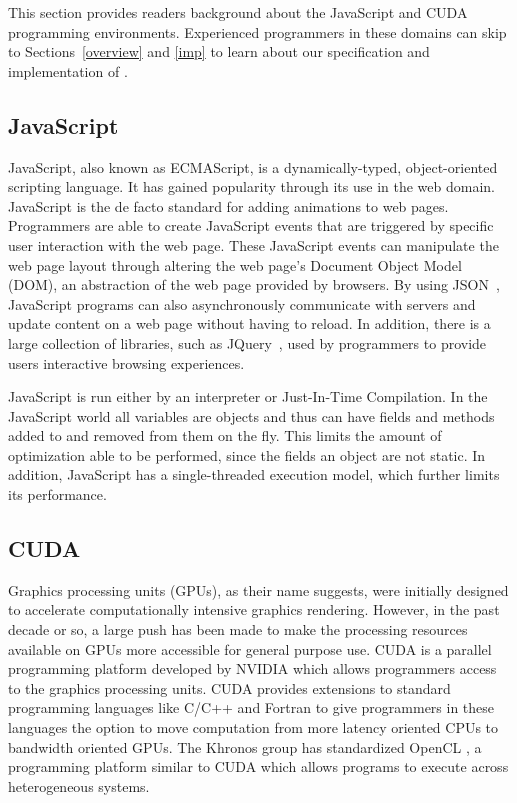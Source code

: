 
This section provides readers background about the JavaScript and CUDA
programming environments. Experienced programmers in these domains can skip to
Sections~\ref{overview} and \ref{imp} to learn about our specification and
implementation of \namens.

\subsection{JavaScript} JavaScript, also known as ECMAScript, is a
dynamically-typed, object-oriented scripting language.  It has gained popularity
through its use in the web domain. JavaScript is the de facto standard for
adding animations to web pages. Programmers are able to create JavaScript events
that are triggered by specific user interaction with the web page. These
JavaScript events can manipulate the web page layout through altering the web
page's Document Object Model (DOM), an abstraction of the web page provided by
browsers. By using JSON~\cite{json}, JavaScript programs can also asynchronously
communicate with servers and update content on a web page without having to
reload. In addition, there is a large collection of libraries, such as
JQuery~\cite{JQuery}, used by programmers to provide users interactive browsing
experiences.

JavaScript is run either by an interpreter or Just-In-Time Compilation. In the
JavaScript world all variables are objects and thus can have fields and methods
added to and removed from them on the fly. This limits the amount of
optimization able to be performed, since the fields an object are not static. In
addition, JavaScript has a single-threaded execution model, which further limits
its performance.

\subsection{CUDA} Graphics processing units (GPUs), as their name suggests, were
initially designed to accelerate computationally intensive graphics rendering.
However, in the past decade or so, a large push has been made to make the
processing resources available on GPUs more accessible for general purpose use.
CUDA is a parallel programming platform developed by NVIDIA which allows
programmers access to the graphics processing units. CUDA provides extensions to
standard programming languages like C/C++ and Fortran to give programmers in
these languages the option to move computation from more latency oriented CPUs
to bandwidth oriented GPUs. The Khronos group has standardized OpenCL
\cite{openCL}, a programming platform similar to CUDA which allows programs to
execute across heterogeneous systems.  

